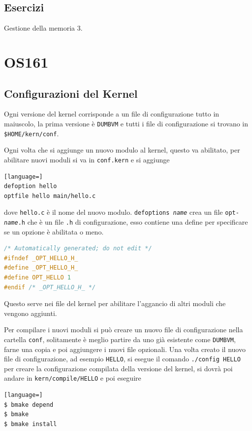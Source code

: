 \documentclass[12pt]{article}
\begin{document}
\subsection{Esercizi}
Gestione della memoria 3.







\newpage
\section{OS161}
\subsection{Configurazioni del Kernel}
Ogni versione del kernel corrisponde a un file di configurazione tutto in maiuscolo, la prima versione \`e \texttt{DUMBVM} e tutti i file di configurazione si trovano in \texttt{\$HOME/kern/conf}.

Ogni volta che si aggiunge un nuovo modulo al kernel, questo va abilitato, per abilitare nuovi moduli si va in \texttt{conf.kern} e si aggiunge
\begin{lstlisting}[language=]
defoption hello
optfile hello main/hello.c
\end{lstlisting}
dove \texttt{hello.c} \`e il nome del nuovo modulo. \texttt{defoptions \emph{name}} crea un file \texttt{opt-\emph{name}.h} che \`e un file \texttt{.h} di configurazione, esso contiene una define per specificare se un opzione \`e abilitata o meno.
\begin{lstlisting}[language=c]
/* Automatically generated; do not edit */
#ifndef _OPT_HELLO_H_
#define _OPT_HELLO_H_
#define OPT_HELLO 1
#endif /* _OPT_HELLO_H_ */
\end{lstlisting}
Questo serve nei file del kernel per abilitare l'aggancio di altri moduli che vengono aggiunti.

Per compilare i nuovi moduli si pu\`o creare un nuovo file di configurazione nella cartella \texttt{conf}, solitamente \`e meglio partire da uno gi\`a esistente come \texttt{DUMBVM}, farne una copia e poi aggiungere i nuovi file opzionali. Una volta creato il nuovo file di configurazione, ad esempio \texttt{HELLO}, si esegue il comando \texttt{./config HELLO} per creare la configurazione compilata della versione del kernel, si dovr\`a poi andare in \texttt{kern/compile/HELLO} e poi eseguire
\begin{lstlisting}[language=]
$ bmake depend
$ bmake
$ bmake install
\end{lstlisting}
\end{document}
